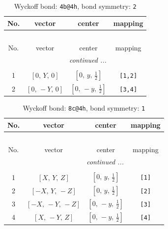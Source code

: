 \documentclass[fleqn,8pt]{jsarticle}
\begin{document}
\renewcommand{\arraystretch}{1.2}
\begin{longtable}{cccc}
\caption{Wyckoff bond: {\tt 4b@4h}, bond symmetry: {\tt 2}}
 \\
 \hline \hline
No. & vector & center & mapping \\ \hline \endfirsthead

\multicolumn{3}{l}{\tablename\ \thetable{}} \\
 \hline \hline
No. & vector & center & mapping \\ \hline \endhead

 \hline \hline
\multicolumn{3}{r}{\footnotesize\it continued ...} \\ \endfoot

 \hline \hline
\multicolumn{3}{r}{} \\ \endlastfoot

1 & $\left[ 0,\, Y,\, 0 \right]$ & $\left[ 0,\, y,\, \frac{1}{2} \right]$ & {\tt [1,2]} \\ \hline
2 & $\left[ 0,\, - Y,\, 0 \right]$ & $\left[ 0,\, - y,\, \frac{1}{2} \right]$ & {\tt [3,4]} \\
\end{longtable}
\renewcommand{\arraystretch}{1.2}
\begin{longtable}{cccc}
\caption{Wyckoff bond: {\tt 8c@4h}, bond symmetry: {\tt 1}}
 \\
 \hline \hline
No. & vector & center & mapping \\ \hline \endfirsthead

\multicolumn{3}{l}{\tablename\ \thetable{}} \\
 \hline \hline
No. & vector & center & mapping \\ \hline \endhead

 \hline \hline
\multicolumn{3}{r}{\footnotesize\it continued ...} \\ \endfoot

 \hline \hline
\multicolumn{3}{r}{} \\ \endlastfoot

1 & $\left[ X,\, Y,\, Z \right]$ & $\left[ 0,\, y,\, \frac{1}{2} \right]$ & {\tt [1]} \\ \hline
2 & $\left[ - X,\, Y,\, - Z \right]$ & $\left[ 0,\, y,\, \frac{1}{2} \right]$ & {\tt [2]} \\ \hline
3 & $\left[ - X,\, - Y,\, - Z \right]$ & $\left[ 0,\, - y,\, \frac{1}{2} \right]$ & {\tt [3]} \\ \hline
4 & $\left[ X,\, - Y,\, Z \right]$ & $\left[ 0,\, - y,\, \frac{1}{2} \right]$ & {\tt [4]} \\
\end{longtable}
\end{document}
